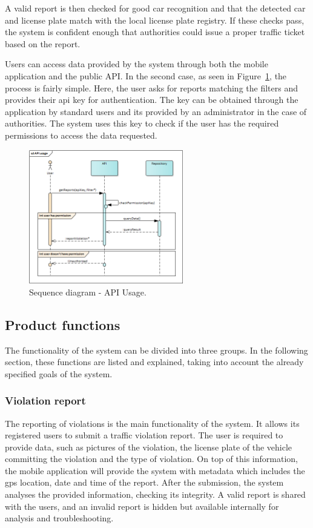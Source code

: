 A valid report is then checked for good car recognition and that the detected car and license plate match with the local license plate registry. If these checks pass, the system is confident enough that authorities could issue a proper traffic ticket based on the report.

Users can access data provided by the system through both the mobile application and the public API. In the second case, as seen in Figure~\ref{fig:api-usage}, the process is fairly simple. Here, the user asks for reports matching the filters and provides their api key for authentication. The key can be obtained through the application by standard users and its provided by an administrator in the case of authorities. The system uses this key to check if the user has the required permissions to access the data requested.

\begin{figure}[!h]
\centering
\includegraphics[width=0.6\textwidth]{Images/api-usage.png}
\caption{\label{fig:api-usage}Sequence diagram - API Usage.}
\end{figure}

\subsection{Product functions}
The functionality of the system can be divided into three groups. In the following section, these functions are listed and explained, taking into account the already specified goals of the system.

\subsubsection{Violation report}
The reporting of violations is the main functionality of the system. It allows its registered users to submit a traffic violation report. The user is required to provide data, such as pictures of the violation, the license plate of the vehicle committing the violation and the type of violation. On top of this information, the mobile application will provide the system with metadata which includes the gps location, date and time of the report.
After the submission, the system analyses the provided information, checking its integrity. A valid report is shared with the users, and an invalid report is hidden but available internally for analysis and troubleshooting.


